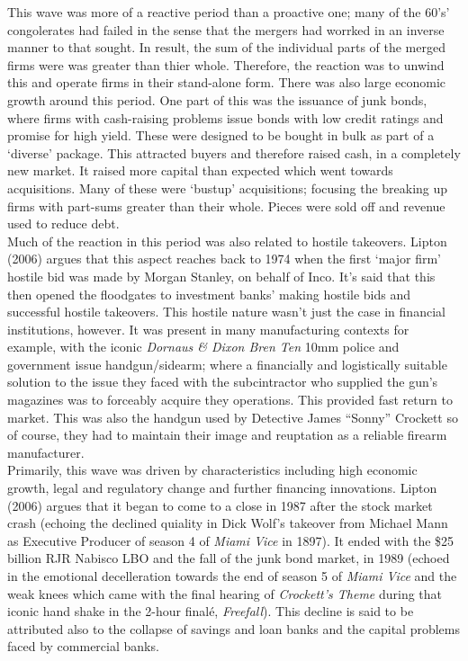 \documentclass[11pt, english]{article}
\begin{document}
	This wave was more of a reactive period than a proactive one; many of the 60's' congolerates had failed in the sense that the mergers had worrked in an inverse manner to that sought. In result, the sum of the individual parts of the merged firms were was greater than thier whole. Therefore, the reaction was to unwind this and operate firms in their stand-alone form. There was also large economic growth around this period. One part of this was the issuance of junk bonds, where firms with cash-raising problems issue bonds with low credit ratings and promise for high yield. These were designed to be bought in bulk as part of a `diverse' package. This attracted buyers and therefore raised cash, in a completely new market. It raised more capital than expected which went towards acquisitions. Many of these were `bustup' acquisitions; focusing the breaking up firms with part-sums greater than their whole. Pieces were sold off and revenue used to reduce debt.\\

	Much of the reaction in this period was also related to hostile takeovers. Lipton (2006) argues that this aspect reaches back to 1974 when the first `major firm' hostile bid was made by Morgan Stanley, on behalf of Inco. It's said that this then opened the floodgates to investment banks' making hostile bids and successful hostile takeovers. This hostile nature wasn't just the case in financial institutions, however. It was present in many manufacturing contexts for example, with the iconic \textit{Dornaus \& Dixon Bren Ten} 10mm police and government issue handgun/sidearm; where a financially and logistically suitable solution to the issue they faced with the subcintractor who supplied the gun's magazines was to forceably acquire they operations. This provided fast return to market. This was also the handgun used by Detective James ``Sonny'' Crockett so of course, they had to maintain their image and reuptation as a reliable firearm manufacturer.\\

	Primarily, this wave was driven by characteristics including high economic growth, legal and regulatory change and further financing innovations. Lipton (2006) argues that it began to come to a close in 1987 after the stock market crash (echoing the declined quiality in Dick Wolf's takeover from Michael Mann as Executive Producer of season 4 of \textit{Miami Vice} in 1897). It ended with the \$25 billion RJR Nabisco LBO and the fall of the junk bond market, in 1989 (echoed in the emotional decelleration towards the end of season 5 of \textit{Miami Vice} and the weak knees which came with the final hearing of \textit{Crockett's Theme} during that iconic hand shake in the 2-hour final\'{e}, \textit{Freefall}). This decline is said to be attributed also to the collapse of savings and loan banks and the capital problems faced by commercial banks.
\end{document}
